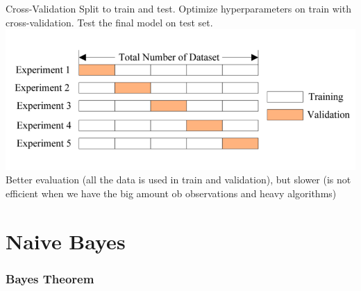 \documentclass[svgnames]{beamer}
\begin{document}
\begin{frame}{Cross-Validation}
  Split to train and test.
  Optimize hyperparameters on train with cross-validation.
  Test the final model on test set.
    \includegraphics[height=.4\textheight]{cross-validation}
  Better evaluation (all the data is used in train and validation), but slower (is not efficient when we have the big amount ob observations and heavy algorithms)
\end{frame}


\section{Naive Bayes}

\begin{frame}
  \frametitle{Bayes Theorem}
\end{frame}
\end{document}
